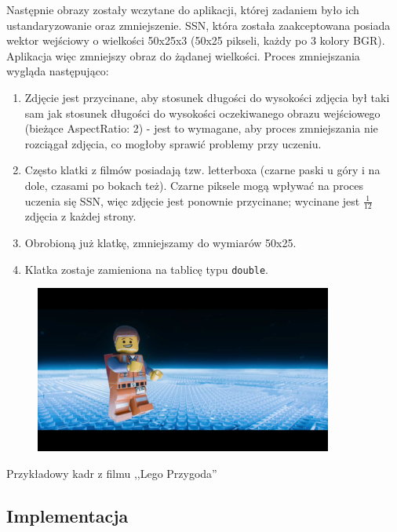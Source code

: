 \documentclass[12pt,a4paper]{article}
\begin{document}
	\par Następnie obrazy zostały wczytane do aplikacji, której zadaniem było ich ustandaryzowanie oraz zmniejszenie. SSN, która została zaakceptowana posiada wektor wejściowy o wielkości 50x25x3 (50x25 pikseli, każdy po 3 kolory BGR). Aplikacja więc zmniejszy obraz do żądanej wielkości. Proces zmniejszania wygląda następująco:
	\begin{enumerate}
	    \item Zdjęcie jest przycinane, aby stosunek długości do wysokości zdjęcia był taki sam jak stosunek długości do wysokości oczekiwanego obrazu wejściowego (bieżące AspectRatio: 2) - jest to wymagane, aby proces zmniejszania nie rozciągał zdjęcia, co mogłoby sprawić problemy przy uczeniu.
	    \item Często klatki z filmów posiadają tzw. letterboxa (czarne paski u góry i na dole, czasami po bokach też). Czarne piksele mogą wpływać na proces uczenia się SSN, więc zdjęcie jest ponownie przycinane; wycinane jest $\frac{1}{12}$ zdjęcia z każdej strony.
	    \item Obrobioną już klatkę, zmniejszamy do wymiarów 50x25.
	    \item Klatka zostaje zamieniona na tablicę typu \lstinline{double}.
	\end{enumerate}
	\begin{figure}[h!]
	    \centering
	    \includegraphics[height=5.5cm]{Lego_150.png}
	\end{figure}
	\begin{center}Przykładowy kadr z filmu ,,Lego Przygoda'' \end{center}
	
	
	\subsection*{Implementacja}
\end{document}
